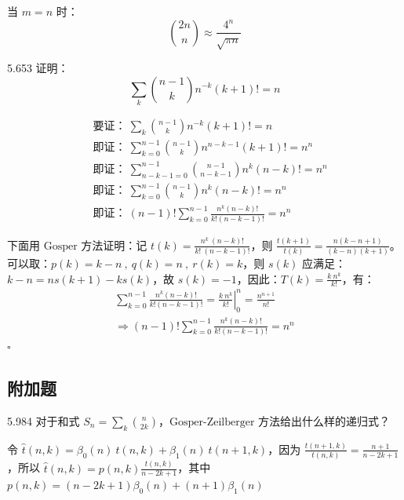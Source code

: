 当 \( m=n \) 时：
\[
  \binom{2n}{n} \approx \frac{4^n}{\sqrt{\pi n}}
\]

\begin{problem}{5.65}{3}
  证明：
  \[
    \sum_k \binom{n-1}{k} n^{-k} (k+1)! = n
  \]
\end{problem}

\begin{align*}
  & \ \text{要证：} \ \sum_k \binom{n-1}{k} n^{-k} (k+1)! = n \\
  & \ \text{即证：} \ \sum_{k=0}^{n-1} \binom{n-1}{k} n^{n-k-1} (k+1)! = n^n \\
  & \ \text{即证：} \ \sum_{n-k-1=0}^{n-1} \binom{n-1}{n-k-1} n^{k} (n-k)! = n^n \\
  & \ \text{即证：} \ \sum_{k=0}^{n-1} \binom{n-1}{k} n^k (n-k)! = n^n \\
  & \ \text{即证：} \ (n-1)! \sum_{k=0}^{n-1} \frac{n^k (n-k)!}{k! (n-k-1)!} = n^n
\end{align*}

下面用 \( \text{Gosper} \) 方法证明：记 \( t(k) = \frac{n^k \ (n-k)!}{k! \ (n-k-1)!} \)，则 \( \frac{t(k+1)}{t(k)} = \frac{n (k-n+1)}{(k-n) (k+1)} \)。可以取：\( p(k) = k-n \ , \ q(k) = n \ , \ r(k) = k \)，则 \( s(k) \) 应满足：\( k-n = n s(k+1) - k s(k) \)，故 \( s(k) = -1 \)，因此：\( T(k) = \frac{k \ n^k}{k!} \)，有：
\begin{gather*}
  \sum_{k=0}^{n-1} \frac{n^k (n-k)!}{k! (n-k-1)!} = \left. \frac{k \ n^k}{k!} \right|_0^n = \frac{n^{n+1}}{n!} \\
  \Rightarrow (n-1)! \sum_{k=0}^{n-1} \frac{n^k (n-k)!}{k! (n-k-1)!} = n^n
\end{gather*}
\hfill \( \square \)

\subsection{附加题}

\begin{problem}{5.98}{4}
  对于和式 \( S_n = \sum_k \binom{n}{2k} \)，\( \text{Gosper-Zeilberger} \) 方法给出什么样的递归式？
\end{problem}

令 \( \hat{t}(n,k) = \beta_0(n) \ t(n,k) + \beta_1(n) \ t(n+1,k) \)，因为 \( \frac{t(n+1,k)}{t(n,k)} = \frac{n+1}{n-2k+1} \)，所以 \( \hat{t}(n,k) = p(n,k) \frac{t(n,k)}{n-2k+1} \)，其中 \( p(n,k) =  (n-2k+1) \beta_0(n) + (n+1) \beta_1(n) \)

